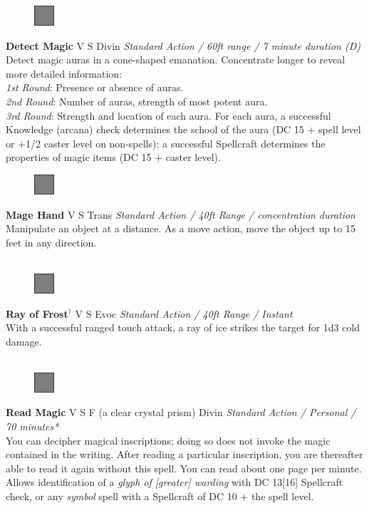 \documentclass[letterpaper]{article}
\newcommand{\e}[1]{\emph{#1}}
\newcommand{\B}[1]{\textbf{#1}}
\newcommand{\spell}[7]{
\begin{figure}
\vspace{-13pt}
\ifstrequal{#2}{Full}{  \includegraphics[width=2em]{Checkbox-Full}}{
\ifstrequal{#2}{Scroll}{\includegraphics[width=2em]{Checkbox-S}}{
                        \includegraphics[width=2em]{Checkbox}}}
\ifstrequal{#7}{}{\vspace{-1em}}{\vspace{#7}}
\end{figure}
 \B{#1} #3 {
    \ifstrequal{#4}{Conj}{\color{Plum}Conj}{%
    \ifstrequal{#4}{Divin}{\color{YellowOrange}Divin}{%
    \ifstrequal{#4}{Ench}{\color{VioletRed}Ench}{%
    \ifstrequal{#4}{Trans}{\color{LimeGreen}Trans}{%
    \ifstrequal{#4}{Evoc}{\color{RedOrange}Evoc}{%
    \ifstrequal{#4}{Illu}{\color{ProcessBlue}Illu}{%
    \ifstrequal{#4}{Abjur}{\color{CadetBlue}Abjur}{%
    \ifstrequal{#4}{Necro}{\color{Red}Necro}{%
}}}}}}}}}
{\footnotesize \e{#5}} \\
#6
}
\begin{document}


\spell{Detect Magic}{Full}{V S}{Divin}{Standard Action / 60ft range / 7 minute duration (D)}{
Detect magic auras in a cone-shaped emanation.  Concentrate longer to reveal more detailed information:\\
\e{1st Round}: Presence or absence of auras.\\
\e{2nd Round}: Number of auras, strength of most potent aura.\\
\e{3rd Round}: Strength and location of each aura.  For each aura, a successful Knowledge (arcana) check determines the school of the aura (DC 15 + spell level or +1/2 caster level on non-spells); a successful Spellcraft determines the properties of magic items (DC 15 + caster level).}{3em} %



\spell{Mage Hand}{Full}{V S}{Trans}{Standard Action / 40ft Range / concentration duration}{%
Manipulate an object at a distance. As a move action, move the object up to 15 feet in any direction.\\}{}\\[-2em] %

\spell{Ray of Frost$^\dag$}{Full}{V S}{Evoc}{Standard Action / 40ft Range / Instant}{
With a successful ranged touch attack, a ray of ice strikes the target for 1d3 cold damage.\\}{}\\[-2em] %

\spell{Read Magic}{Full}{V S F (a clear crystal prism)}{Divin}{Standard Action / Personal / 70 minutes*}{
You can decipher magical inscriptions; doing so does not invoke the magic contained in the writing.  After reading a particular inscription, you are thereafter able to read it again without this spell.  You can read about one page per minute. Allows identification of a \e{glyph of [greater] warding} with DC 13[16] Spellcraft check, or any \e{symbol} spell with a Spellcraft of DC 10 + the spell level.}{1em}\\[-2em] %
\end{document}
